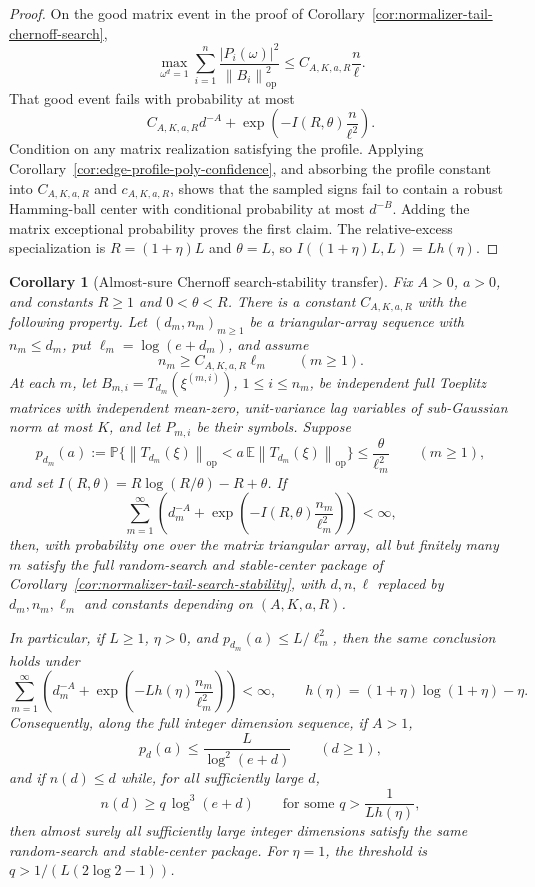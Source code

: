 \documentclass[11pt]{amsart}
\numberwithin{equation}{section}
\newtheorem{corollary}[theorem]{Corollary}
\theoremstyle{definition}
\theoremstyle{remark}
\newcommand{\op}{\mathrm{op}}
\newcommand{\Prob}{\mathbb P}
\newcommand{\Exp}{\mathbb E}
\newcommand{\norm}[1]{\left\lVert #1\right\rVert}
\begin{document}
\begin{proof}
On the good matrix event in the proof of
Corollary~\ref{cor:normalizer-tail-chernoff-search},
\[
  \max_{\omega^d=1}\sum_{i=1}^n
  \frac{|P_i(\omega)|^2}{\norm{B_i}_{\op}^2}
  \le C_{A,K,a,R}\frac n\ell .
\]
That good event fails with probability at most
\[
  C_{A,K,a,R}d^{-A}
  +\exp\left(-I(R,\theta)\frac n{\ell^2}\right).
\]
Condition on any matrix realization satisfying the profile.  Applying
Corollary~\ref{cor:edge-profile-poly-confidence}, and absorbing the profile
constant into \(C_{A,K,a,R}\) and \(c_{A,K,a,R}\), shows that the sampled signs
fail to contain a robust Hamming-ball center with conditional probability at
most \(d^{-B}\).  Adding the matrix exceptional probability proves the first
claim.  The relative-excess specialization is \(R=(1+\eta)L\) and
\(\theta=L\), so \(I((1+\eta)L,L)=Lh(\eta)\).
\end{proof}

\begin{corollary}[Almost-sure Chernoff search-stability transfer]
\label{cor:normalizer-tail-chernoff-borel-search}
Fix \(A>0\), \(a>0\), and constants \(R\ge1\) and \(0<\theta<R\).  There is a
constant \(C_{A,K,a,R}\) with the following property.  Let \((d_m,n_m)_{m\ge1}\)
be a triangular-array sequence with \(n_m\le d_m\), put
\(\ell_m=\log(e+d_m)\), and assume
\[
  n_m\ge C_{A,K,a,R}\ell_m \qquad(m\ge1).
\]
At each \(m\), let \(B_{m,i}=T_{d_m}(\xi^{(m,i)})\), \(1\le i\le n_m\), be
independent full Toeplitz matrices with independent mean-zero, unit-variance
lag variables of sub-Gaussian norm at most \(K\), and let \(P_{m,i}\) be their
symbols.  Suppose
\[
  p_{d_m}(a):=
  \Prob\{\norm{T_{d_m}(\xi)}_{\op}
      <a\,\Exp\norm{T_{d_m}(\xi)}_{\op}\}
  \le \frac{\theta}{\ell_m^2}
  \qquad(m\ge1),
\]
and set \(I(R,\theta)=R\log(R/\theta)-R+\theta\).  If
\[
  \sum_{m=1}^\infty
  \left(d_m^{-A}+
  \exp\left(-I(R,\theta)\frac{n_m}{\ell_m^2}\right)\right)<\infty,
\]
then, with probability one over the matrix triangular array, all but finitely
many \(m\) satisfy the full random-search and stable-center package of
Corollary~\ref{cor:normalizer-tail-search-stability}, with
\(d,n,\ell\) replaced by \(d_m,n_m,\ell_m\) and constants depending on
\((A,K,a,R)\).

In particular, if \(L\ge1\), \(\eta>0\), and
\(p_{d_m}(a)\le L/\ell_m^2\), then the same conclusion holds under
\[
  \sum_{m=1}^\infty
  \left(d_m^{-A}+
  \exp\left(-Lh(\eta)\frac{n_m}{\ell_m^2}\right)\right)<\infty,
  \qquad h(\eta)=(1+\eta)\log(1+\eta)-\eta .
\]
Consequently, along the full integer dimension sequence, if \(A>1\),
\[
  p_d(a)\le \frac{L}{\log^2(e+d)}
  \qquad(d\ge1),
\]
and if \(n(d)\le d\) while, for all sufficiently large \(d\),
\[
  n(d)\ge q\,\log^3(e+d)
  \qquad\text{for some } q>\frac1{Lh(\eta)},
\]
then almost surely all sufficiently large integer dimensions satisfy the same
random-search and stable-center package.  For \(\eta=1\), the threshold is
\(q>1/(L(2\log2-1))\).
\end{corollary}
\end{document}
